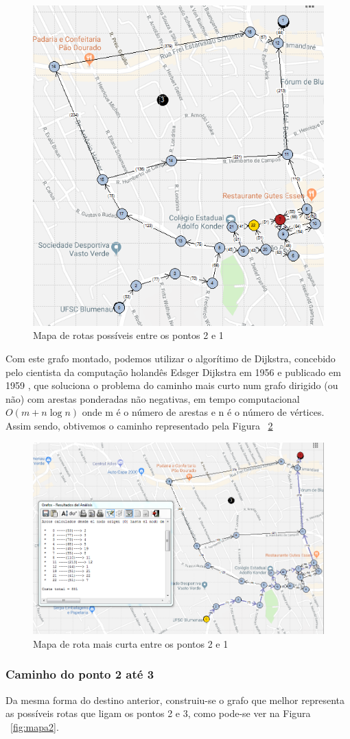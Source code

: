 \documentclass[a4paper,12pt]{article}
\begin{document}
\begin{figure}[H]
	\begin{center}
		\includegraphics[width=0.45\linewidth]{cam1.png}
	\end{center}
	\caption{Mapa de rotas possíveis entre os pontos 2 e 1}
	\label{fig:mapa1}
\end{figure}

Com este grafo montado, podemos utilizar o algorítimo de Dijkstra, concebido pelo cientista da computação holandês Edsger Dijkstra em 1956 e publicado em 1959 \cite{dijkstra1959note}, que soluciona o problema do caminho mais curto num grafo dirigido (ou não) com arestas ponderadas não negativas, em tempo computacional $O(m + n \log{n})$ onde m é o número de arestas e n é o número de vértices. Assim sendo, obtivemos o caminho representado pela Figura ~\ref{fig:mapa1sol}

\begin{figure}[H]
	\begin{center}
		\includegraphics[width=0.7\linewidth]{cam1sol.png}
	\end{center}
	\caption{Mapa de rota mais curta entre os pontos 2 e 1}
	\label{fig:mapa1sol}
\end{figure}

\subsubsection*{Caminho do ponto 2 até 3}
Da mesma forma do destino anterior, construiu-se o grafo que melhor representa as possíveis rotas que ligam os pontos 2 e 3, como pode-se ver na Figura ~\ref{fig:mapa2}.
\end{document}
